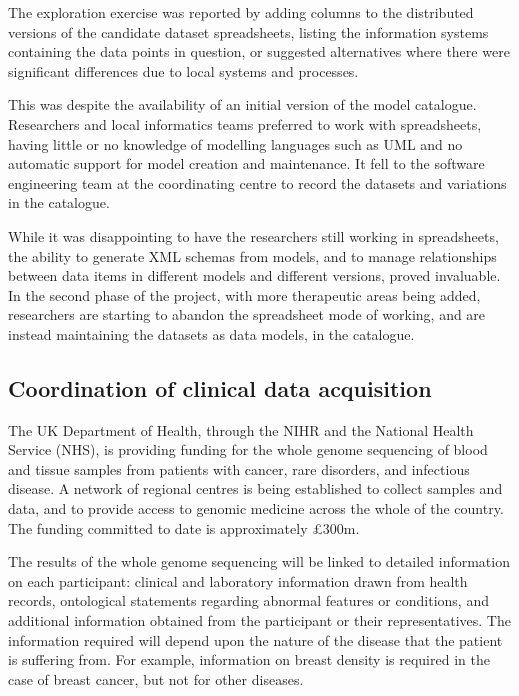 The exploration exercise was reported by adding columns to the
distributed versions of the candidate dataset spreadsheets, listing
the information systems containing the data points in question, or
suggested alternatives where there were significant differences due to
local systems and processes.

This was despite the availability of an initial version of the model
catalogue.  Researchers and local informatics teams preferred to work
with spreadsheets, having little or no knowledge of modelling
languages such as UML and no automatic support for model creation and
maintenance.  It fell to the software engineering team at the
coordinating centre to record the datasets and variations in the
catalogue.

While it was disappointing to have the researchers still working in
spreadsheets, the ability to generate XML schemas from models, and to
manage relationships between data items in different models and
different versions, proved invaluable.  In the second phase of the
project, with more therapeutic areas being added, researchers are
starting to abandon the spreadsheet mode of working, and are instead
maintaining the datasets as data models, in the catalogue.

\subsection{Coordination of clinical data acquisition}

The UK Department of Health, through the NIHR and the National Health
Service (NHS), is providing funding for the whole genome sequencing of
blood and tissue samples from patients with cancer, rare disorders,
and infectious disease.  A network of regional centres is being
established to collect samples and data, and to provide access to
genomic medicine across the whole of the country.  The funding
committed to date is approximately \pounds 300m.

The results of the whole genome sequencing will be linked to detailed
information on each participant: clinical and laboratory information
drawn from health records, ontological statements regarding abnormal
features or conditions, and additional information obtained from the
participant or their representatives.  The information required will
depend upon the nature of the disease that the patient is suffering
from.  For example, information on breast density is required in the
case of breast cancer, but not for other diseases.

